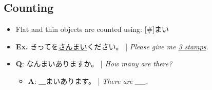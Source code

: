 \documentclass{article}
\begin{document}
\begin{CJK}{UTF8}{min}
\subsection{Counting}

\begin{itemize}
\item Flat and thin objects are counted using: [\#]まい
\item {\bf Ex.} きってを\uline{さんまい}ください。 | \emph{Please give me \uline{3 stamps}.}
\item {\bf Q}: なんまいありますか。 | \emph{How many are there?}
\begin{itemize}
\item {\bf A}: ＿まいあります。 | \emph{There are \_\_.}
\end{itemize}
\end{itemize}




\end{CJK}
\end{document}
